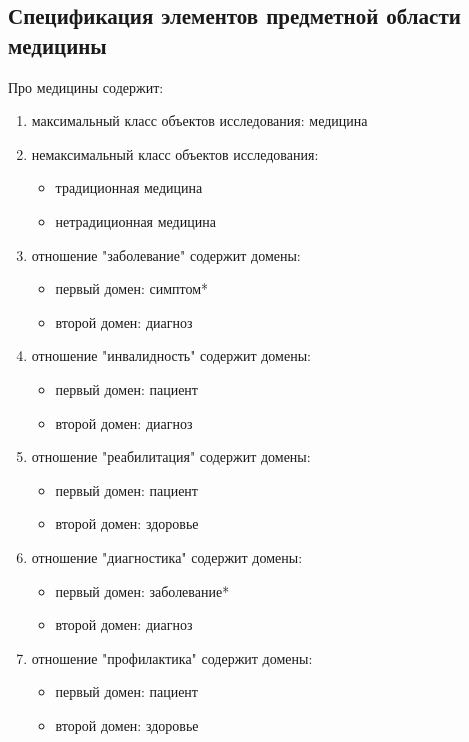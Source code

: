 \subsection{Спецификация элементов предметной области медицины}
Про медицины содержит:
\begin{enumerate}
	\item максимальный класс объектов исследования: медицина
	\item немаксимальный класс объектов исследования: 
	\begin{itemize}
		\item традиционная медицина
		\item нетрадиционная медицина\\
	\end{itemize}
	
	\item отношение "заболевание" содержит домены:
	\begin{itemize}
		\item первый домен: симптом*
		\item второй домен: диагноз\\
	\end{itemize}
	
	\item отношение "инвалидность" содержит домены:
	\begin{itemize}
		\item первый домен: пациент
		\item второй домен: диагноз\\
	\end{itemize}
	
	\item отношение "реабилитация" содержит домены:
	\begin{itemize}
		\item первый домен: пациент
		\item второй домен: здоровье\\
	\end{itemize}
	
	\item отношение "диагностика" содержит домены:
	\begin{itemize}
		\item первый домен: заболевание*
		\item второй домен: диагноз\\
	\end{itemize}
	
	\item отношение "профилактика" содержит домены:
	\begin{itemize}
		\item первый домен: пациент
		\item второй домен: здоровье\\
	\end{itemize}
	

\end{enumerate}
